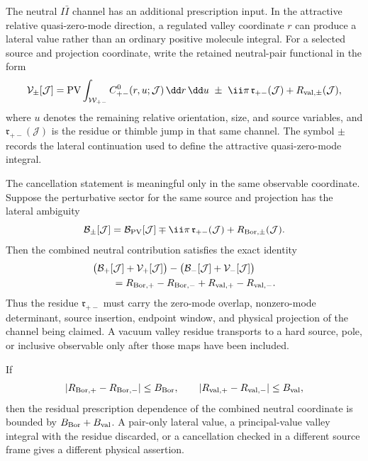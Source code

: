 \begin{controlledapproximation}
\label{ca:instanton-neutral-pair-valley-prescription}
The neutral \(I\bar I\) channel has an additional prescription input.  In the
attractive relative quasi-zero-mode direction, a regulated valley coordinate
\(r\) can produce a lateral value rather than an ordinary positive molecule
integral.  For a selected source and projection coordinate, write the retained
neutral-pair functional in the form
\begin{equation}
  \mathcal V_{\pm}[\mathcal J]
  =
  \operatorname{PV}
  \int_{\mathcal W_{+-}}
  C_{+-}^{0}(r,u;\mathcal J)\,\dd r\,\dd u
  \ \pm\ \ii\pi\,\mathfrak r_{+-}(\mathcal J)
  +R_{\rm val,\pm}(\mathcal J),
  \label{eq:instanton-neutral-valley-lateral}
\end{equation}
where \(u\) denotes the remaining relative orientation, size, and source
variables, and \(\mathfrak r_{+-}(\mathcal J)\) is the residue or thimble
jump in that same channel.  The symbol \(\pm\) records the lateral
continuation used to define the attractive quasi-zero-mode integral.

The cancellation statement is meaningful only in the same observable
coordinate.  Suppose the perturbative sector for the same source and
projection has the lateral ambiguity
\begin{equation}
  \mathcal B_{\pm}[\mathcal J]
  =
  \mathcal B_{\rm PV}[\mathcal J]
  \mp\ii\pi\,\mathfrak r_{+-}(\mathcal J)
  +R_{\rm Bor,\pm}(\mathcal J).
  \label{eq:instanton-neutral-valley-borel-partner}
\end{equation}
Then the combined neutral contribution satisfies the exact identity
\begin{equation}
\begin{aligned}
  &\bigl(\mathcal B_{+}[\mathcal J]+\mathcal V_{+}[\mathcal J]\bigr)
  -
  \bigl(\mathcal B_{-}[\mathcal J]+\mathcal V_{-}[\mathcal J]\bigr) \\
  &\qquad =
  R_{\rm Bor,+}-R_{\rm Bor,-}+R_{\rm val,+}-R_{\rm val,-}.
\end{aligned}
  \label{eq:instanton-neutral-valley-ambiguity-cancellation}
\end{equation}
Thus the residue \(\mathfrak r_{+-}\) must carry the zero-mode overlap,
nonzero-mode determinant, source insertion, endpoint window, and physical
projection of the channel being claimed.  A vacuum valley residue transports
to a hard source, pole, or inclusive observable only after those maps have
been included.

If
\[
  |R_{\rm Bor,+}-R_{\rm Bor,-}|\le B_{\rm Bor},
  \qquad
  |R_{\rm val,+}-R_{\rm val,-}|\le B_{\rm val},
\]
then the residual prescription dependence of the combined neutral coordinate
is bounded by \(B_{\rm Bor}+B_{\rm val}\).  A pair-only lateral value, a
principal-value valley integral with the residue discarded, or a cancellation
checked in a different source frame gives a different physical assertion.
\end{controlledapproximation}

